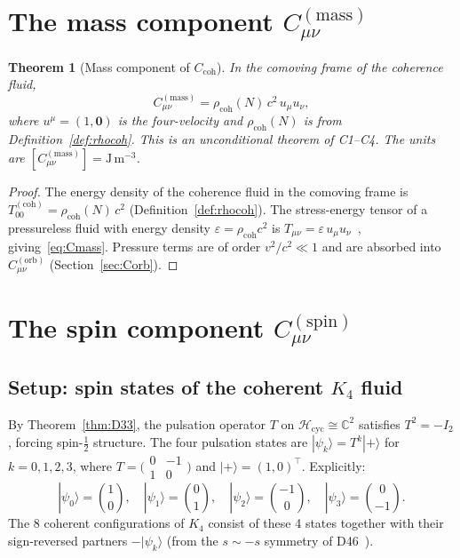 \documentclass[12pt,a4paper]{article}
\newtheorem{theorem}{Theorem}[section]
\newcommand{\Kfour}{K_4}
\newcommand{\Ccoh}{C_{\mathrm{coh}}}
\newcommand{\Cmass}{C^{(\mathrm{mass})}}
\newcommand{\Cspin}{C^{(\mathrm{spin})}}
\newcommand{\Corb}{C^{(\mathrm{orb})}}
\newcommand{\rhocoh}{\rho_{\mathrm{coh}}}
\begin{document}
\section{The mass component \texorpdfstring{$\Cmass_{\mu\nu}$}{C(mass)}}
\label{sec:Cmass}

\begin{theorem}[Mass component of $\Ccoh$]
\label{thm:Cmass}
In the comoving frame of the coherence fluid,
\begin{equation}
\Cmass_{\mu\nu} = \rhocoh(N)\,c^2\,u_\mu u_\nu,
\label{eq:Cmass}
\end{equation}
where $u^\mu = (1,\mathbf{0})$ is the four-velocity and $\rhocoh(N)$ is from Definition~\ref{def:rhocoh}. This is an unconditional theorem of C1--C4. The units are $[\Cmass_{\mu\nu}] = \mathrm{J\,m^{-3}}$.
\end{theorem}

\begin{proof}
The energy density of the coherence fluid in the comoving frame is $T_{00}^{(\mathrm{coh})} = \rhocoh(N)\,c^2$ (Definition~\ref{def:rhocoh}). The stress-energy tensor of a pressureless fluid with energy density $\varepsilon = \rhocoh c^2$ is $T_{\mu\nu} = \varepsilon\,u_\mu u_\nu$~\cite{Misner_1973}, giving~\eqref{eq:Cmass}. Pressure terms are of order $v^2/c^2 \ll 1$ and are absorbed into $\Corb_{\mu\nu}$ (Section~\ref{sec:Corb}).
\end{proof}

\section{The spin component \texorpdfstring{$\Cspin_{\mu\nu}$}{C(spin)}}
\label{sec:Cspin}

\subsection{Setup: spin states of the coherent \texorpdfstring{$K_4$}{K4} fluid}

By Theorem~\ref{thm:D33}, the pulsation operator $T$ on $\mathcal{H}_{\mathrm{cyc}} \cong \mathbb{C}^2$ satisfies $T^2 = -I_2$, forcing spin-$\tfrac{1}{2}$ structure. The four pulsation states are $|\psi_k\rangle = T^k|{+}\rangle$ for $k = 0,1,2,3$, where $T = \bigl(\begin{smallmatrix}0&-1\\1&0\end{smallmatrix}\bigr)$ and $|{+}\rangle = (1,0)^\top$. Explicitly:
\begin{equation}
|\psi_0\rangle = \binom{1}{0},\quad |\psi_1\rangle = \binom{0}{1},\quad |\psi_2\rangle = \binom{-1}{0},\quad |\psi_3\rangle = \binom{0}{-1}.
\end{equation}
The 8 coherent configurations of $\Kfour$ consist of these 4 states together with their sign-reversed partners $-|\psi_k\rangle$ (from the $s\sim -s$ symmetry of D46~\cite{PDL_D46_2026}).
\end{document}
